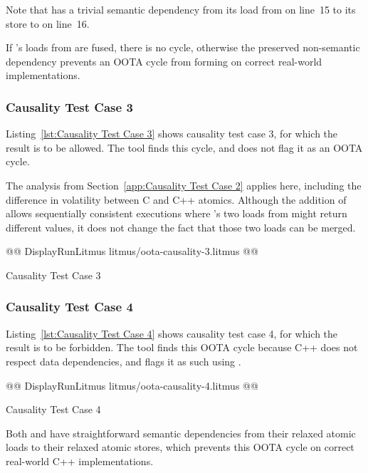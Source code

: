 \documentclass[10]{article}
\begin{document}
Note that  has a trivial semantic dependency from its load
from  on line~15 to its store to  on line~16.

If 's loads from  are fused, there is no cycle,
otherwise the preserved non-semantic dependency prevents an
OOTA cycle from forming on correct real-world implementations.

\subsubsection{Causality Test Case 3}
\label{app:Causality Test Case 3}

Listing~\ref{lst:Causality Test Case 3}
shows causality test case 3, for which the  result
is to be allowed.
The  tool finds this cycle, and does not flag it as an OOTA cycle.

The analysis from Section~\ref{app:Causality Test Case 2}
applies here, including the difference in volatility between C and C++
atomics.
Although the addition of  allows sequentially consistent executions
where 's two loads from  might return different values,
it does not change the fact that those two loads can be merged.

\begin{listing}[tbp]
@@ DisplayRunLitmus litmus/oota-causality-3.litmus @@
\caption{Causality Test Case 3}
\label{lst:Causality Test Case 3}
\end{listing}

\subsubsection{Causality Test Case 4}
\label{app:Causality Test Case 4}

Listing~\ref{lst:Causality Test Case 4}
shows causality test case 4, for which the  result
is to be forbidden.
The  tool finds this OOTA cycle because C++ does not respect
data dependencies, and flags it as such using .

\begin{listing}[tbp]
@@ DisplayRunLitmus litmus/oota-causality-4.litmus @@
\caption{Causality Test Case 4}
\label{lst:Causality Test Case 4}
\end{listing}

Both  and  have straightforward semantic dependencies
from their relaxed atomic loads to their relaxed atomic stores, which
prevents this OOTA cycle on correct real-world C++ implementations.
\end{document}
